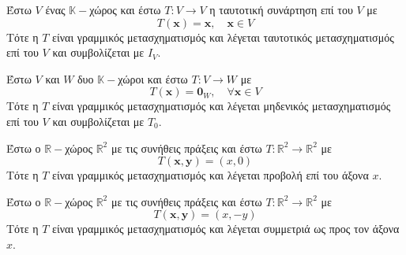 
\begin{example}[Ταυτοτικός]
  Έστω $V$ ένας $ \mathbb{K} - $χώρος και έστω $ T \colon V \to V $ η ταυτοτική 
  συνάρτηση επί του $V$ με 
  \[
    T(\mathbf{x}) = \mathbf{x}, \quad \mathbf{x} \in V   
  \]
  Τότε η $T$ είναι γραμμικός μετασχηματισμός και λέγεται 
  \textcolor{Col1}{ταυτοτικός} μετασχηματισμός επί του $V$ και συμβολίζεται με $ I_{V} $.
\end{example}

\begin{example}[Μηδενικός]
  Έστω $V$ και $W$ δυο $ \mathbb{K}- $χώροι και έστω $ T \colon V \to W $ με 
  \[
    T(\mathbf{x}) = \mathbf{0}_{W}, \quad \forall \mathbf{x} \in V
  \]
  Τότε η $T$ είναι γραμμικός μετασχηματισμός και λέγεται 
  \textcolor{Col1}{μηδενικός} μετασχηματισμός επί του $V$ και συμβολίζεται με $ T_{0} $.
\end{example}

\begin{example}
  Έστω ο $ \mathbb{R}- $χώρος $ \mathbb{R}^{2} $ με τις συνήθεις πράξεις και έστω 
  $ T \colon \mathbb{R}^{2} \to \mathbb{R}^{2} $ με 
  \[
    T(\mathbf{x}, \mathbf{y}) = (x, 0) 
  \] 
  Τότε η $T$ είναι γραμμικός μετασχηματισμός και λέγεται \textcolor{Col1}{προβολή} επί 
  του άξονα $x$.
\end{example}

\begin{example}
  Έστω ο $ \mathbb{R}- $χώρος $ \mathbb{R}^{2} $ με τις συνήθεις πράξεις και έστω 
  $ T \colon \mathbb{R}^{2} \to \mathbb{R}^{2} $ με 
  \[
    T(\mathbf{x}, \mathbf{y}) = (x, -y) 
  \] 
  Τότε η $T$ είναι γραμμικός μετασχηματισμός και λέγεται \textcolor{Col1}{συμμετριά} ως 
  προς τον άξονα $x$.
\end{example}

